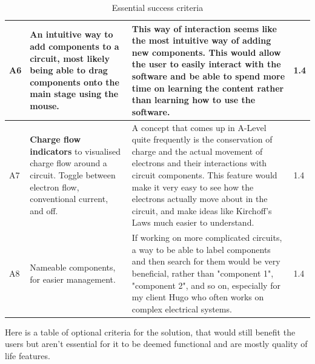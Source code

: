 \documentclass[11pt]{article}
\begin{document}
\begin{table}[!ht]
\begin{tabular}{|l|m{187pt}|m{188pt}|l|}
                    A6 & An intuitive way to add components to a circuit, most likely being able to drag components onto the main stage using the mouse. & This way of interaction seems like the most intuitive way of adding new components. This would allow the user to easily interact with the software and be able to spend more time on learning the content rather than learning how to use the software. & 1.4 \\ \hline
                    A7 & \textbf{Charge flow indicators} to visualised charge flow around a circuit. Toggle between electron flow, conventional current, and off. & A concept that comes up in A-Level quite frequently is the conservation of charge and the actual movement of electrons and their interactions with circuit components. This feature would make it very easy to see how the electrons actually move about in the circuit, and make ideas like Kirchoff's Laws much easier to understand. & 1.4 \\ \hline
                    A8 & Nameable components, for easier management. & If working on more complicated circuits, a way to be able to label components and then search for them would be very beneficial, rather than "component 1", "component 2", and so on, especially for my client Hugo who often works on complex electrical systems. & 1.4 \\ \hline
                \end{tabular}
                \caption{Essential success criteria}
                \label{tbl:essential_succ_crit}
            \end{table}


            \pagebreak

            Here is a table of optional criteria for the solution, that would still benefit the users but aren't essential for it to be deemed functional and are mostly quality of life features.
            
\end{document}
